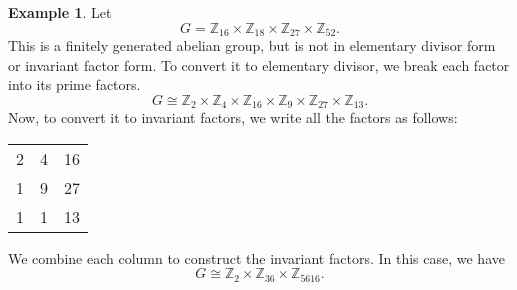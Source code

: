 \documentclass[a4paper, openany]{memoir}
\theoremstyle{definition}
\newtheorem{example}[definition]{Example}
\theoremstyle{plain}
\begin{document}
    \begin{example}
        Let
        \[G = \mathbb{Z}_{16} \times \mathbb{Z}_{18} \times \mathbb{Z}_{27} \times \mathbb{Z}_{52}.\]
        This is a finitely generated abelian group, but is not in elementary divisor form or invariant factor form. To convert it to elementary divisor, we break each factor into its prime factors.
        \[G \cong \mathbb{Z}_2 \times \mathbb{Z}_4 \times \mathbb{Z}_{16} \times \mathbb{Z}_9 \times \mathbb{Z}_{27} \times \mathbb{Z}_{13}.\]
        Now, to convert it to invariant factors, we write all the factors as follows:
        \begin{table}[H]
            \centering
            \begin{tabular}{ccc}
                2 & 4 & 16 \\
                1 & 9 & 27 \\
                1 & 1 & 13 
            \end{tabular}
        \end{table}
        \noindent We combine each column to construct the invariant factors. In this case, we have
        \[G \cong \mathbb{Z}_2 \times \mathbb{Z}_{36} \times \mathbb{Z}_{5616}.\]
    \end{example}



\end{document}
